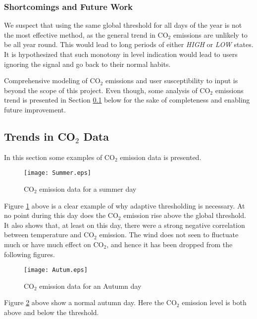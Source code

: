 \documentclass[Main]{subfiles}
\begin{document}
	\subsubsection{Shortcomings and Future Work} %
	\label{sub:shortcomings_and_future_work}
		We suspect that using the same global threshold for all days of the year is not the most effective method, as the general trend in CO$_2$ emissions are unlikely to be all year round.
		This would lead to long periods of either \emph{HIGH} or \emph{LOW} states.
		It is hypothesized that such monotony in level indication would lead to users ignoring the signal and go back to their normal habits.

		Comprehensive modeling of CO$_2$ emissions and user susceptibility to input is beyond the scope of this project.
		Even though, some analysis of CO$_2$ emissions trend is presented in Section \ref{sub:trends_in_co2_data} below for the sake of completeness and enabling future improvement.



	\subsection{Trends in CO$_2$ Data} %
	\label{sub:trends_in_co2_data}
		
		In this section some examples of CO$_2$ emission data is presented.

		\begin{figure}[H]
			\centering 
			\texttt{[image: Summer.eps]}
			\caption{CO$_2$ emission data for a summer day}
			\label{fig:Summer}
		\end{figure}

		Figure \ref{fig:Summer} above is a clear example of why adaptive thresholding is necessary.
		At no point during this day does the CO$_2$ emission rise above the global threshold.
		It also shows that, at least on this day, there were a strong negative correlation between temperature and CO$_2$ emission.
		The wind does not seen to fluctuate much or have much effect on CO$_2$, and hence it has been dropped from the following figures.


		\begin{figure}[H]
			\centering
			\texttt{[image: Autum.eps]}
			\caption{CO$_2$ emission data for an Autumn day}
			\label{fig:Autum}
		\end{figure}

		Figure \ref{fig:Autum} above show a normal autumn day. Here the CO$_2$ emission level is both above and below the threshold.
\end{document}
